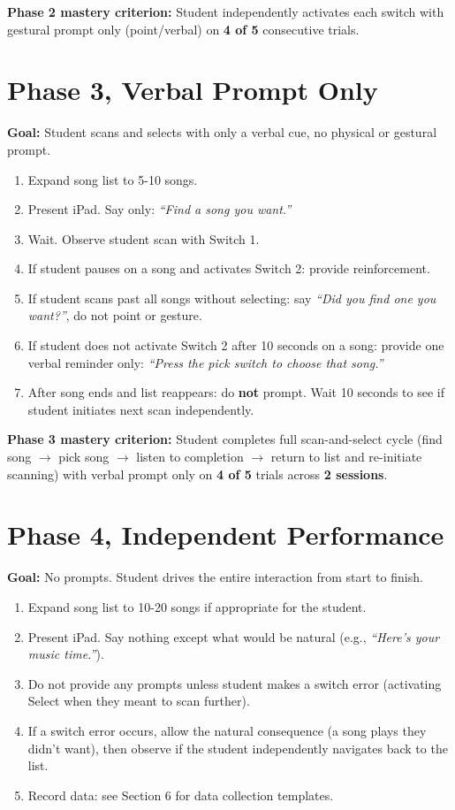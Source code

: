 \documentclass[justified,openright]{tufte-book}
\begin{document}
\textbf{Phase 2 mastery criterion:} Student independently activates each
switch with gestural prompt only (point/verbal) on \textbf{4 of 5}
consecutive trials.

\section{Phase 3, Verbal Prompt
Only}\label{phase-3-verbal-prompt-only}

\textbf{Goal:} Student scans and selects with only a verbal cue, no
physical or gestural prompt.

\begin{enumerate}
\item
  Expand song list to 5-10 songs.
\item
  Present iPad. Say only: \emph{``Find a song you want.''}
\item
  Wait. Observe student scan with Switch 1.
\item
  If student pauses on a song and activates Switch 2: provide
  reinforcement.
\item
  If student scans past all songs without selecting: say \emph{``Did you
  find one you want?''}, do not point or gesture.
\item
  If student does not activate Switch 2 after 10 seconds on a song:
  provide one verbal reminder only: \emph{``Press the pick switch to
  choose that song.''}
\item
  After song ends and list reappears: do \textbf{not} prompt. Wait 10
  seconds to see if student initiates next scan independently.
\end{enumerate}

\textbf{Phase 3 mastery criterion:} Student completes full
scan-and-select cycle (find song $\rightarrow$ pick song $\rightarrow$ listen to completion $\rightarrow$
return to list and re-initiate scanning) with verbal prompt only on
\textbf{4 of 5} trials across \textbf{2 sessions}.

\section{Phase 4, Independent
Performance}\label{phase-4-independent-performance}

\textbf{Goal:} No prompts. Student drives the entire interaction from
start to finish.

\begin{enumerate}
\item
  Expand song list to 10-20 songs if appropriate for the student.
\item
  Present iPad. Say nothing except what would be natural (e.g.,
  \emph{``Here's your music time.''}).
\item
  Do not provide any prompts unless student makes a switch error
  (activating Select when they meant to scan further).
\item
  If a switch error occurs, allow the natural consequence (a song plays
  they didn't want), then observe if the student independently
  navigates back to the list.
\item
  Record data: see Section 6 for data collection templates.
\end{enumerate}
\end{document}
